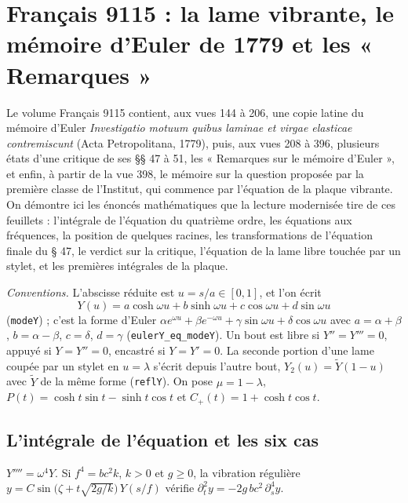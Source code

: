 \section[Français 9115 : la lame vibrante, Euler et les « Remarques »]{Français 9115 : la lame vibrante, le mémoire d'Euler de 1779 et les « Remarques »\protect{}}\label{sec:fr-9115-elasticite}

Le volume Français 9115 contient, aux vues 144 à 206, une copie latine du mémoire d'Euler \emph{Investigatio motuum quibus laminae et virgae elasticae contremiscunt} (Acta Petropolitana, 1779), puis, aux vues 208 à 396, plusieurs états d'une critique de ses §§ 47 à 51, les « Remarques sur le mémoire d'Euler », et enfin, à partir de la vue 398, le mémoire sur la question proposée par la première classe de l'Institut, qui commence par l'équation de la plaque vibrante. On démontre ici les énoncés mathématiques que la lecture modernisée tire de ces feuillets : l'intégrale de l'équation du quatrième ordre, les équations aux fréquences, la position de quelques racines, les transformations de l'équation finale du § 47, le verdict sur la critique, l'équation de la lame libre touchée par un stylet, et les premières intégrales de la plaque.

\noindent\emph{Conventions.} L'abscisse réduite est $u = s/a \in [0,1]$, et l'on écrit
\[
Y(u) = a\cosh\omega u + b\sinh\omega u + c\cos\omega u + d\sin\omega u
\]
(\texttt{modeY}) ; c'est la forme d'Euler $\alpha e^{\omega u} + \beta e^{-\omega u} + \gamma\sin\omega u + \delta\cos\omega u$ avec $a = \alpha+\beta$, $b = \alpha-\beta$, $c = \delta$, $d = \gamma$ (\texttt{eulerY\_eq\_modeY}). Un bout est libre si $Y'' = Y''' = 0$, appuyé si $Y = Y'' = 0$, encastré si $Y = Y' = 0$. La seconde portion d'une lame coupée par un stylet en $u = \lambda$ s'écrit depuis l'autre bout, $Y_2(u) = \tilde Y(1-u)$ avec $\tilde Y$ de la même forme (\texttt{reflY}). On pose $\mu = 1-\lambda$, $P(t) = \cosh t\sin t - \sinh t\cos t$ et $C_+(t) = 1 + \cosh t\cos t$.

\subsection*{L'intégrale de l'équation et les six cas}

\begin{enonce}
$Y'''' = \omega^4 Y$. Si $f^4 = bc^2k$, $k > 0$ et $g \geq 0$, la vibration régulière $y = C\sin\bigl(\zeta + t\sqrt{2g/k}\bigr)\,Y(s/f)$ vérifie $\partial_t^2 y = -2g\,bc^2\,\partial_s^4 y$.
\end{enonce}

